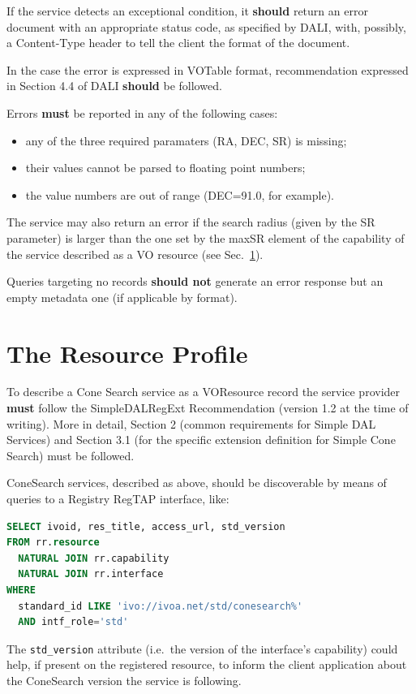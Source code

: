 \documentclass[11pt,a4paper]{ivoa}
\begin{document}
If the service detects an exceptional condition, it \textbf{should} return
an error document with an appropriate status code, as specified by DALI,
with, possibly, a Content-Type header to tell the client the format of
the document.

In the case the error is expressed in VOTable format, recommendation
expressed in Section 4.4 of DALI \textbf{should} be followed.

Errors \textbf{must} be reported in any of the following cases:
\begin{itemize}
	\item any of the three required paramaters (RA, DEC, SR) is missing;
	\item	their values cannot be parsed to floating point numbers;
	\item the value numbers are out of range (DEC=91.0, for example).
\end{itemize}

The service may also return an error if the search radius (given by the
SR parameter) is larger than the one set by the maxSR element of the
capability of the service described as a VO resource (see
Sec.~\ref{sec:3}).

Queries targeting no records \textbf{should not} generate an error
response but an empty metadata one (if applicable by format).

\section{The Resource Profile}
\label{sec:3} 

To describe a Cone Search service as a VOResource record the service
provider \textbf{must} follow the 
SimpleDALRegExt \citep{2022ivoa.spec.0222D} Recommendation (version 1.2
at the time of writing).
More in detail, Section 2 (common requirements for Simple DAL Services)
and Section 3.1 (for the specific extension definition for
Simple Cone Search) must be followed.

ConeSearch services, described as above, should be discoverable by means
of queries to a Registry RegTAP \citep{2024ivoa.spec.1002D} interface, like:
\begin{lstlisting}[language=SQL]
SELECT ivoid, res_title, access_url, std_version
FROM rr.resource
  NATURAL JOIN rr.capability
  NATURAL JOIN rr.interface 
WHERE
  standard_id LIKE 'ivo://ivoa.net/std/conesearch%'
  AND intf_role='std'
\end{lstlisting}

The \texttt{std\_version} attribute (i.e.\ the version of the interface's
capability) could help, if present on the registered resource, to inform
the client application about the ConeSearch version the service is
following.
\end{document}
